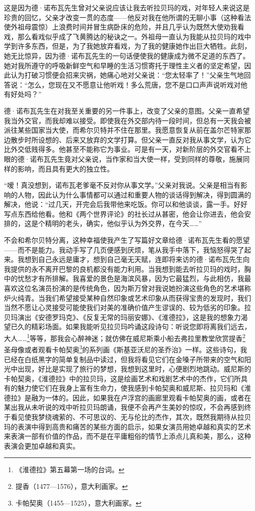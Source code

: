 \par 这是因为德·诺布瓦先生曾对父亲说应该让我去听拉贝玛的戏，对年轻人来说这是珍贵的回忆，父亲才改变一贯的态度——他反对我在他所谓的无聊小事（这种看法使外祖母震惊）上浪费时间并冒生病卧床的危险，并且几乎认为既然大使劝我看戏，那么看戏似乎成了飞黄腾达的秘诀之一。外祖母一直认为我能从拉贝玛的戏中学到许多东西，但是，为了我她放弃看戏，为了我的健康她作出巨大牺牲。此刻，她无比惊异，因为德·诺布瓦先生的一句话便使我的健康成为微不足道的东西了。她对我所遵守的呼吸新鲜空气和早睡的生活习惯寄托于理性主义者的坚定希望，因此认为打破习惯便会招来灾祸，她痛心地对父亲说：“您太轻率了！”父亲生气地回答说：“怎么，您现在又不愿意让他听戏！多么荒唐，您不是口口声声说听戏对他有好处吗？”
\par 德·诺布瓦先生在对我至关重要的另一件事上，改变了父亲的意图。父亲一直希望我当外交官，而我却难以接受。即使我在外交部内待一段时间，但总有一天我会被派往某些国家当大使，而希尔贝特并不住在那里。我愿意恢复从前在盖尔芒特家那边散步时所设想的、后来又放弃的文学打算。但父亲一直反对我从事文学，认为它比外交低贱得多。他甚至不能称它为事业。可是有一天，对新阶层的外交官看不上眼的德·诺布瓦先生竟对父亲说，当作家和当大使一样，受到同样的尊敬，施展同样的影响，而且具有更大的独立性。
\par “嗳！真没想到，诺布瓦老爹毫不反对你从事文学。”父亲对我说。父亲是相当有影响的人物，因此认为什么事情都可以通过和重要人物的谈话得到解决，得到圆满的解决，他说：“过几天，开完会后我带他来吃饭。你可以和他谈谈，露一手。好好写点东西给他看。他和《两个世界评论》的社长过从甚密，他会让你进去，他会安排的，这是个精明的老头，确实，他似乎认为外交界，在今天……”
\par 不会和希尔贝特分离，这种幸福使我产生了写篇好文章给德·诺布瓦先生看的愿望——而不是能力。我动手写了几页便感到厌烦，笔从我手中落下，我恼怒得哭了起来。我想到自己永远是庸才，想到自己毫无天赋，连即将来访的德·诺布瓦先生向我提供的永不离开巴黎的良机都没有能力利用。当我想到能去听拉贝玛的戏时，胸中的忧愁才有所排解。我喜爱的景色是海滨风暴，因为它最猛烈，与此相仿，我最喜欢这位名演员扮演的是传统角色，因为斯万曾对我说她扮演这些角色的艺术堪称炉火纯青。当我们希望接受某种自然印象或艺术印象从而获得宝贵的发现时，我们当然不愿让心灵接受可能使我们对美的准确价值产生谬误的、较为低劣的印象。拉贝玛演出《安德罗玛克》、《反复无常的玛丽安娜》、《淮德拉》，这是我的想象力渴望已久的精彩场面。如果我能听见拉贝玛吟诵这段诗句：听说您即将离我们远去，大人……\footnote{《淮德拉》第五幕第一场的台词。}等等，那我会心醉神迷；就仿佛在威尼斯乘小船去弗拉里教堂欣赏提香\footnote{提香（1477—1576），意大利画家。}圣母像或者观看卡帕契奥\footnote{卡帕契奥（1455—1525），意大利画家。}的系列画《斯基亚沃尼的圣乔治》一样。这些诗句，我已经在白纸黑字的简单复制品中读过，但我将看见它们在金嗓子所带来的空气和阳光中出现，好比是实现了旅行的梦想，我想到这里时，心便剧烈地跳动。威尼斯的卡帕契奥，《淮德拉》中的拉贝玛，这是绘画艺术和戏剧艺术中的杰作，它们所具有的魅力使它们在我身上富有生命力，使我感到卡帕契奥和威尼斯、拉贝玛和《淮德拉》是融为一体的。因此，如果我在卢浮宫的画廊里观看卡帕契奥的画，或者在某出我从未听说的戏中听拉贝玛朗诵，我便不会再产生美妙的惊叹，不会再感到终于看见使我梦绕魂萦的、不可思议的、无与伦比的杰作，其次，既然我期待从拉贝玛的表演中得到高贵和痛苦的某些方面的启示，如果女演员用她卓越和真实的艺术来表演一部有价值的作品，而不是在平庸粗俗的情节上添点儿真和美，那么，这种表演会更加卓越和真实。
